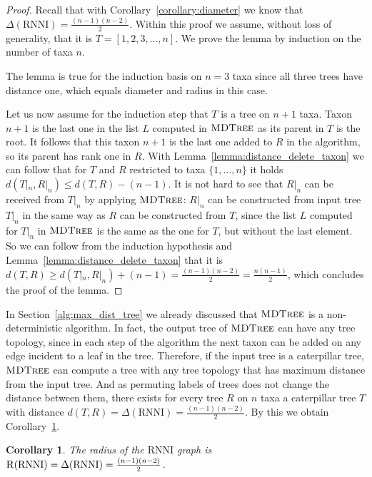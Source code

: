 \documentclass{amsart}
\newcommand{\rnni}{\mathrm{RNNI}}
\newcommand{\mdtree}{\textsc{MDTree}}
\newcommand{\rad}{\textsc{R}}
\newtheorem{corollary}[definition]{Corollary}
\begin{document}
\begin{proof}
Recall that with Corollary~\ref{corollary:diameter} we know that $\Delta(\rnni) = \frac{(n-1)(n-2)}{2}$.
Within this proof we assume, without loss of generality, that it is $T = [1,2,3,\ldots,n]$.
We prove the lemma by induction on the number of taxa $n$.

The lemma is true for the induction basis on $n=3$ taxa since all three trees have distance one, which equals diameter and radius in this case.

Let us now assume for the induction step that $T$ is a tree on $n+1$ taxa.
Taxon $n+1$ is the last one in the list $L$ computed in $\mdtree$ as its parent in $T$ is the root.
It follows that this taxon $n+1$ is the last one added to $R$ in the algorithm, so its parent has rank one in $R$.
With Lemma~\ref{lemma:distance_delete_taxon} we can follow that for $T$ and $R$ restricted to taxa $\{1, \ldots, n\}$ it holds $d(T|_n,R|_n) \leq d(T,R) - (n-1)$.
It is not hard to see that $R|_n$ can be received from $T|_n$ by applying $\mdtree$:
$R|_n$ can be constructed from input tree $T|_n$ in the same way as $R$ can be constructed from $T$, since the list $L$ computed for $T|_n$ in $\mdtree$ is the same as the one for $T$, but without the last element.
So we can follow from the induction hypothesis and Lemma~\ref{lemma:distance_delete_taxon} that it is $d(T,R) \geq d(T|_n,R|_n) + (n-1) = \frac{(n-1)(n-2)}{2} = \frac{n(n-1)}{2}$, which concludes the proof of the lemma.
\end{proof}

In Section~\ref{alg:max_dist_tree} we already discussed that $\mdtree$ is a non-deterministic algorithm.
In fact, the output tree of $\mdtree$ can have any tree topology, since in each step of the algorithm the next taxon can be added on any edge incident to a leaf in the tree.
Therefore, if the input tree is a caterpillar tree, $\mdtree$ can compute a tree with any tree topology that has maximum distance from the input tree.
And as permuting labels of trees does not change the distance between them, there exists for every tree $R$ on $n$ taxa a caterpillar tree $T$ with distance $d(T,R) = \Delta(\rnni) = \frac{(n-1)(n-2)}{2}$.
By this we obtain Corollary~\ref{corollary:radius}.

\begin{corollary}
The radius of the $\rnni$ graph is $\rad(\rnni) = \Delta(\rnni) = \frac{(n-1)(n-2)}{2}$.
\label{corollary:radius}
\end{corollary}
\end{document}
